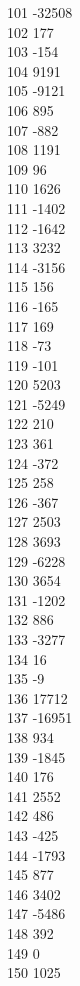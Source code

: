 { 101	-32508 \\
 102	177 \\
 103	-154 \\
 104	9191 \\
 105	-9121 \\
 106	895 \\
 107	-882 \\
 108	1191 \\
 109	96 \\
 110	1626 \\
 111	-1402 \\
 112	-1642 \\
 113	3232 \\
 114	-3156 \\
 115	156 \\
 116	-165 \\
 117	169 \\
 118	-73 \\
 119	-101 \\
 120	5203 \\
 121	-5249 \\
 122	210 \\
 123	361 \\
 124	-372 \\
 125	258 \\
 126	-367 \\
 127	2503 \\
 128	3693 \\
 129	-6228 \\
 130	3654 \\
 131	-1202 \\
 132	886 \\
 133	-3277 \\
 134	16 \\
 135	-9 \\
 136	17712 \\
 137	-16951 \\
 138	934 \\
 139	-1845 \\
 140	176 \\
 141	2552 \\
 142	486 \\
 143	-425 \\
 144	-1793 \\
 145	877 \\
 146	3402 \\
 147	-5486 \\
 148	392 \\
 149	0 \\
 150	1025 \\
}
